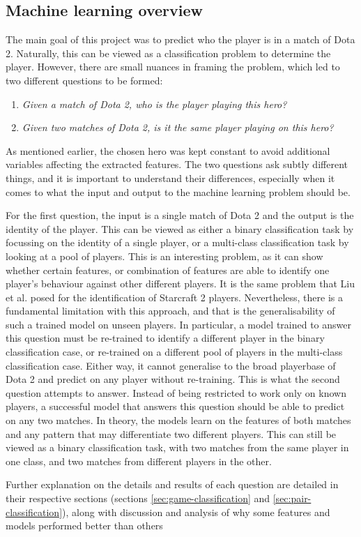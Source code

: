 \documentclass[Report.tex]{subfiles}
\begin{document}
\subsection{Machine learning overview}
The main goal of this project was to predict who the player is in a match of Dota 2. Naturally, this can be viewed as a classification problem to determine the player. However, there are small nuances in framing the problem, which led to two different questions to be formed:

\begin{enumerate}
\item \textit{Given a match of Dota 2, who is the player playing this hero?}
\item \textit{Given two matches of Dota 2, is it the same player playing on this hero?}
\end{enumerate}

As mentioned earlier, the chosen hero was kept constant to avoid additional variables affecting the extracted features. The two questions ask subtly different things, and it is important to understand their differences, especially when it comes to what the input and output to the machine learning problem should be. 

For the first question, the input is a single match of Dota 2 and the output is the identity of the player. This can be viewed as either a binary classification task by focussing on the identity of a single player, or a multi-class classification task by looking at a pool of players. This is an interesting problem, as it can show whether certain features, or combination of features are able to identify one player's behaviour against other different players. It is the same problem that Liu et al. \cite{starcraft-identification} posed for the identification of Starcraft 2 players. Nevertheless, there is a fundamental limitation with this approach, and that is the generalisability of such a trained model on unseen players. In particular, a model trained to answer this question must be re-trained to identify a different player in the binary classification case, or re-trained on a different pool of players in the multi-class classification case. Either way, it cannot generalise to the broad playerbase of Dota 2 and predict on any player without re-training. This is what the second question attempts to answer. Instead of being restricted to work only on known players, a successful model that answers this question should be able to predict on any two matches. In theory, the models learn on the features of both matches and any pattern that may differentiate two different players. This can still be viewed as a binary classification task, with two matches from the same player in one class, and two matches from different players in the other. 

Further explanation on the details and results of each question are detailed in their respective sections (sections \ref{sec:game-classification} and \ref{sec:pair-classification}), along with discussion and analysis of why some features and models performed better than others 
\end{document}
